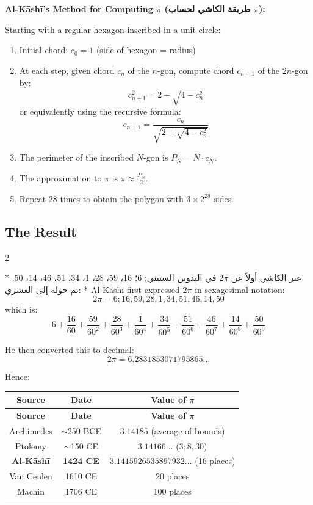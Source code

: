 \documentclass[11pt,a4paper]{article}
\newcommand{\ar}[1]{{\arabicfont\beginR #1\endR}}
\newenvironment{bilingual}{%
  \vspace{0.3em}%
  \begin{paracol}{2}%
}{%
  \end{paracol}%
  \vspace{0.3em}%
}
\newenvironment{mathalgo}{%
  \par\vspace{0.3cm}
  \begin{framed}
  \setlength{\parindent}{0pt}
}{%
  \end{framed}
  \par\vspace{0.3cm}
}
\begin{document}
\begin{mathalgo}
\textbf{Al-K\=ash\=i's Method for Computing $\pi$ (\ar{طريقة الكاشي لحساب $\pi$}):}

Starting with a regular hexagon inscribed in a unit circle:
\begin{enumerate}[nosep]
  \item Initial chord: $c_0 = 1$ (side of hexagon = radius)
  \item At each step, given chord $c_n$ of the $n$-gon, compute chord
  $c_{n+1}$ of the $2n$-gon by:
    \[
    c_{n+1}^2 = 2 - \sqrt{4 - c_n^2}
    \]
  or equivalently using the recursive formula:
    \[
    c_{n+1} = \frac{c_n}{\sqrt{2 + \sqrt{4 - c_n^2}}}
    \]
  \item The perimeter of the inscribed $N$-gon is $P_N = N \cdot c_N$.
  \item The approximation to $\pi$ is $\pi \approx \frac{P_N}{2}$.
  \item Repeat 28 times to obtain the polygon with $3 \times 2^{28}$ sides.
\end{enumerate}
\end{mathalgo}

\subsection{The Result}

\begin{bilingual}
\switchcolumn[0]*
\ar{عبر الكاشي أولاً عن $2\pi$ في التدوين الستيني: 6؛ 16، 59، 28، 1، 34، 51، 46، 14، 50. ثم حوله إلى العشري:}
\switchcolumn[1]*
Al-K\=ash\=i first expressed $2\pi$ in sexagesimal notation:
\[
2\pi = 6; 16, 59, 28, 1, 34, 51, 46, 14, 50
\]
which is:
\[
6 + \frac{16}{60} + \frac{59}{60^2} + \frac{28}{60^3} + \frac{1}{60^4} +
\frac{34}{60^5} + \frac{51}{60^6} + \frac{46}{60^7} + \frac{14}{60^8} +
\frac{50}{60^9}
\]
\end{bilingual}

\noindent He then converted this to decimal:
\[
2\pi = 6.2831853071795865\ldots
\]

\noindent Hence:
\begin{center}
\fbox{$\pi = 3.1415926535897932\ldots$}
\end{center}

\begin{longtable}{|c|c|c|}
\hline
\textbf{Source} & \textbf{Date} & \textbf{Value of $\pi$} \\
\hline
\endfirsthead
\hline
\textbf{Source} & \textbf{Date} & \textbf{Value of $\pi$} \\
\hline
\endhead
Archimedes & $\sim$250 BCE & $3.14185$ (average of bounds) \\
\hline
Ptolemy & $\sim$150 CE & $3.14166\ldots$ ($3; 8, 30$) \\
\hline
\textbf{Al-K\=ash\=i} & \textbf{1424 CE} & $\mathbf{3.1415926535897932\ldots}$
(16 places) \\
\hline
Van Ceulen & 1610 CE & 20 places \\
\hline
Machin & 1706 CE & 100 places \\
\hline
\end{longtable}
\end{document}
